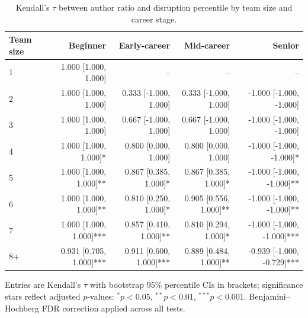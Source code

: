 \begin{table}\centering
\caption{Kendall's $\tau$ between author ratio and disruption percentile by team size and career stage.}
\begin{tabular}{lrrrr}
Team size & Beginner & Early-career & Mid-career & Senior \\
\midrule
1 & 1.000 [1.000, 1.000] & -- & -- & -- \\
2 & 1.000 [1.000, 1.000] & 0.333 [-1.000, 1.000] & 0.333 [-1.000, 1.000] & -1.000 [-1.000, -1.000] \\
3 & 1.000 [1.000, 1.000] & 0.667 [-1.000, 1.000] & 0.667 [-1.000, 1.000] & -1.000 [-1.000, -1.000] \\
4 & 1.000 [1.000, 1.000]* & 0.800 [0.000, 1.000] & 0.800 [0.000, 1.000] & -1.000 [-1.000, -1.000]* \\
5 & 1.000 [1.000, 1.000]** & 0.867 [0.385, 1.000]* & 0.867 [0.385, 1.000]* & -1.000 [-1.000, -1.000]** \\
6 & 1.000 [1.000, 1.000]** & 0.810 [0.250, 1.000]* & 0.905 [0.556, 1.000]** & -1.000 [-1.000, -1.000]** \\
7 & 1.000 [1.000, 1.000]*** & 0.857 [0.410, 1.000]** & 0.810 [0.294, 1.000]* & -1.000 [-1.000, -1.000]*** \\
8+ & 0.931 [0.705, 1.000]*** & 0.911 [0.600, 1.000]*** & 0.889 [0.484, 1.000]** & -0.939 [-1.000, -0.729]*** \\
\bottomrule
\end{tabular}
\vspace{0.25em}
\footnotesize{Entries are Kendall's $\tau$ with bootstrap 95\% percentile CIs in brackets; significance stars reflect adjusted $p$-values: $^{*}p<0.05$, $^{**}p<0.01$, $^{***}p<0.001$. Benjamini–Hochberg FDR correction applied across all tests.}
\end{table}
